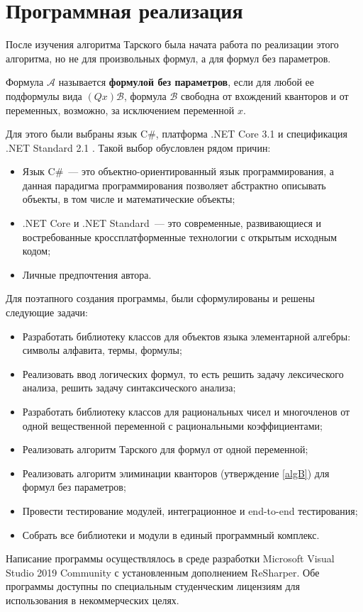 \section{Программная реализация}

После изучения алгоритма Тарского была начата работа по реализации этого алгоритма, но не для произвольных формул, а для формул без параметров.

\begin{definition}
    Формула $\mathcal{A}$ называется \textbf{формулой без параметров}, если для любой ее подформулы вида $(Qx)\mathcal{B}$, формула $\mathcal{B}$ свободна от вхождений кванторов и от переменных, возможно, за исключением переменной $x$.
\end{definition}

Для этого были выбраны язык C\#, платформа .NET Core 3.1 и спецификация .NET Standard 2.1 \cite{TroelsonNet}. Такой выбор обусловлен рядом причин:
\begin{itemize}
    \item Язык C\#~--- это объектно-ориентированный язык программирования, а данная парадигма программирования позволяет абстрактно описывать объекты, в том числе и математические объекты; 
    \item .NET Core и .NET Standard~--- это современные, развивающиеся и востребованные кроссплатформенные технологии с открытым исходным кодом;
    \item Личные предпочтения автора.
\end{itemize}
Для поэтапного создания программы, были сформулированы и решены следующие задачи:
\begin{itemize}
    \item Разработать библиотеку классов для объектов языка элементарной алгебры: символы алфавита, термы, формулы;
    \item Реализовать ввод логических формул, то есть решить задачу лексического анализа, решить задачу синтаксического анализа;
    \item Разработать библиотеку классов для рациональных чисел и многочленов от одной вещественной переменной с рациональными коэффициентами;
    \item Реализовать алгоритм Тарского для формул от одной переменной;
    \item Реализовать алгоритм элиминации кванторов (утверждение \ref{algB}) для формул без параметров;
    \item Провести тестирование модулей, интеграционное и end-to-end тестирования;
    \item Собрать все библиотеки и модули в единый программный комплекс.
\end{itemize}
Написание программы осуществлялось в среде разработки Microsoft Visual Studio 2019 Community с установленным дополнением ReSharper. Обе программы доступны по специальным студенческим лицензиям для использования в некоммерческих целях.

